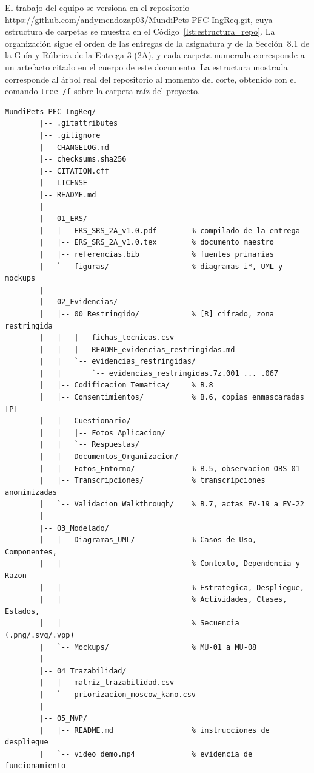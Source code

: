\documentclass[journal,onecolumn]{IEEEtran}
\begin{document}
	El trabajo del equipo se versiona en el repositorio
	\url{https://github.com/andymendozap03/MundiPets-PFC-IngReq.git}, cuya
	estructura de carpetas se muestra en el Código~\ref{lst:estructura_repo}. La
	organización sigue el orden de las entregas de la asignatura y de la
	Sección~8.1 de la Guía y Rúbrica de la Entrega 3 (2A), y cada carpeta
	numerada corresponde a un artefacto citado en el cuerpo de este documento.
	La estructura mostrada corresponde al árbol real del repositorio al
	momento del corte, obtenido con el comando \texttt{tree /f} sobre la
	carpeta raíz del proyecto.
	
	\begin{lstlisting}[style=csharp,caption={Estructura de carpetas del repositorio MundiPets-PFC-IngReq (árbol real al corte de la Entrega 3, 2A).},label={lst:estructura_repo}]
		MundiPets-PFC-IngReq/
		|-- .gitattributes
		|-- .gitignore
		|-- CHANGELOG.md
		|-- checksums.sha256
		|-- CITATION.cff
		|-- LICENSE
		|-- README.md
		|
		|-- 01_ERS/
		|   |-- ERS_SRS_2A_v1.0.pdf        % compilado de la entrega
		|   |-- ERS_SRS_2A_v1.0.tex        % documento maestro
		|   |-- referencias.bib            % fuentes primarias
		|   `-- figuras/                   % diagramas i*, UML y mockups
		|
		|-- 02_Evidencias/
		|   |-- 00_Restringido/            % [R] cifrado, zona restringida
		|   |   |-- fichas_tecnicas.csv
		|   |   |-- README_evidencias_restringidas.md
		|   |   `-- evidencias_restringidas/
		|   |       `-- evidencias_restringidas.7z.001 ... .067
		|   |-- Codificacion_Tematica/     % B.8
		|   |-- Consentimientos/           % B.6, copias enmascaradas [P]
		|   |-- Cuestionario/
		|   |   |-- Fotos_Aplicacion/
		|   |   `-- Respuestas/
		|   |-- Documentos_Organizacion/
		|   |-- Fotos_Entorno/             % B.5, observacion OBS-01
		|   |-- Transcripciones/           % transcripciones anonimizadas
		|   `-- Validacion_Walkthrough/    % B.7, actas EV-19 a EV-22
		|
		|-- 03_Modelado/
		|   |-- Diagramas_UML/             % Casos de Uso, Componentes,
		|   |                              % Contexto, Dependencia y Razon
		|   |                              % Estrategica, Despliegue,
		|   |                              % Actividades, Clases, Estados,
		|   |                              % Secuencia (.png/.svg/.vpp)
		|   `-- Mockups/                   % MU-01 a MU-08
		|
		|-- 04_Trazabilidad/
		|   |-- matriz_trazabilidad.csv
		|   `-- priorizacion_moscow_kano.csv
		|
		|-- 05_MVP/
		|   |-- README.md                  % instrucciones de despliegue
		|   `-- video_demo.mp4             % evidencia de funcionamiento

\end{lstlisting}
\end{document}
